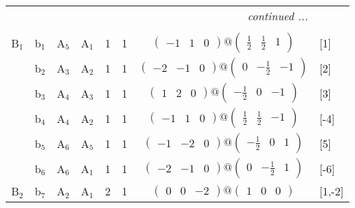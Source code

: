 \documentclass[fleqn,10pt,landscape]{article}
\begin{document}
\begin{itemize}
\begin{center}
\begin{longtable}{cc|cc|c|c|c|l}
 \hline \hline
\multicolumn{7}{r}{\footnotesize\it continued ...} \\ \endfoot

 \hline \hline
\multicolumn{7}{r}{} \\ \endlastfoot

B$_{1}$ & b$_{1}$ & A$_{5}$ & A$_{1}$ & 1 & 1 & $\begin{pmatrix} -1 & 1 & 0 \end{pmatrix}@\begin{pmatrix} \frac{1}{2} & \frac{1}{2} & 1 \end{pmatrix}$ & [1] \\
& b$_{2}$ & A$_{3}$ & A$_{2}$ & 1 & 1 & $\begin{pmatrix} -2 & -1 & 0 \end{pmatrix}@\begin{pmatrix} 0 & - \frac{1}{2} & -1 \end{pmatrix}$ & [2] \\
& b$_{3}$ & A$_{4}$ & A$_{3}$ & 1 & 1 & $\begin{pmatrix} 1 & 2 & 0 \end{pmatrix}@\begin{pmatrix} - \frac{1}{2} & 0 & -1 \end{pmatrix}$ & [3] \\
& b$_{4}$ & A$_{4}$ & A$_{2}$ & 1 & 1 & $\begin{pmatrix} -1 & 1 & 0 \end{pmatrix}@\begin{pmatrix} \frac{1}{2} & \frac{1}{2} & -1 \end{pmatrix}$ & [-4] \\
& b$_{5}$ & A$_{6}$ & A$_{5}$ & 1 & 1 & $\begin{pmatrix} -1 & -2 & 0 \end{pmatrix}@\begin{pmatrix} - \frac{1}{2} & 0 & 1 \end{pmatrix}$ & [5] \\
& b$_{6}$ & A$_{6}$ & A$_{1}$ & 1 & 1 & $\begin{pmatrix} -2 & -1 & 0 \end{pmatrix}@\begin{pmatrix} 0 & - \frac{1}{2} & 1 \end{pmatrix}$ & [-6] \\ \hline
B$_{2}$ & b$_{7}$ & A$_{2}$ & A$_{1}$ & 2 & 1 & $\begin{pmatrix} 0 & 0 & -2 \end{pmatrix}@\begin{pmatrix} 1 & 0 & 0 \end{pmatrix}$ & [1,-2] \\

\end{longtable}
\end{center}
\end{itemize}
\end{document}
